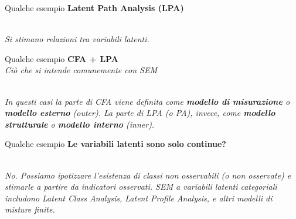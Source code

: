 \documentclass{beamer}
\begin{document}
\begin{frame}{Qualche esempio}
    \centering
    \textbf{Latent Path Analysis (LPA)} \\
    \vspace{2em}
    \vspace{2em} \\
    \textit{Si stimano relazioni tra variabili latenti.}
\end{frame}

\begin{frame}{Qualche esempio}
    \centering
    \textbf{CFA + LPA} \\
    \textit{Ciò che si intende comunemente con SEM} \\
    \vspace{2em}
    \vspace{2em} \\
    \small
    \textit{In questi casi la parte di CFA viene definita come \textbf{modello di misurazione} o \textbf{modello esterno} (outer). La parte di LPA (o PA), invece, come \textbf{modello strutturale} o \textbf{modello interno} (inner).}
\end{frame}

\begin{frame}{Qualche esempio}
    \centering
    \textbf{Le variabili latenti sono solo continue?} \\
    \vspace{2em}
    \vspace{2em} \\
    \textit{No. Possiamo ipotizzare l'esistenza di classi non osservabili (o non osservate) e stimarle a partire da indicatori osservati. SEM a variabili latenti categoriali includono Latent Class Analysis, Latent Profile Analysis, e altri modelli di misture finite.}
\end{frame}
\end{document}
